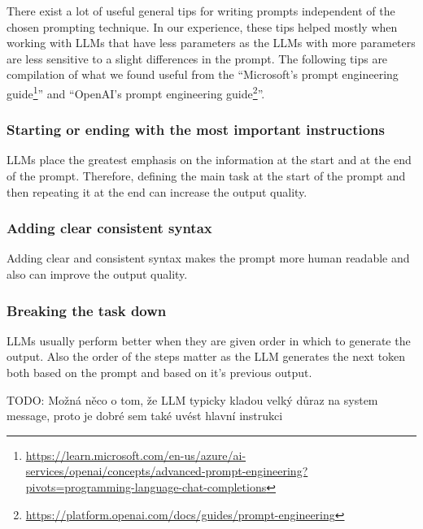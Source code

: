 There exist a lot of useful general tips for writing prompts independent of the chosen prompting technique. In our experience, these tips helped mostly when working with LLMs that have less parameters as the LLMs with more parameters are less sensitive to a slight differences in the prompt. The following tips are compilation of what we found useful from the ``Microsoft's prompt engineering guide\footnote{\url{https://learn.microsoft.com/en-us/azure/ai-services/openai/concepts/advanced-prompt-engineering?pivots=programming-language-chat-completions}}'' and ``OpenAI's prompt engineering guide\footnote{\url{https://platform.openai.com/docs/guides/prompt-engineering}}''.


\subsubsection{Starting or ending with the most important instructions}
LLMs place the greatest emphasis on the information at the start and at the end of the prompt. Therefore, defining the main task at the start of the prompt and then repeating it at the end can increase the output quality.


\subsubsection{Adding clear consistent syntax}
Adding clear and consistent syntax makes the prompt more human readable and also can improve the output quality.


\subsubsection{Breaking the task down}
LLMs usually perform better when they are given order in which to generate the output. Also the order of the steps matter as the LLM generates the next token both based on the prompt and based on it's previous output.



TODO: Možná něco o tom, že LLM typicky kladou velký důraz na system message, proto je dobré sem také uvést hlavní instrukci \\

